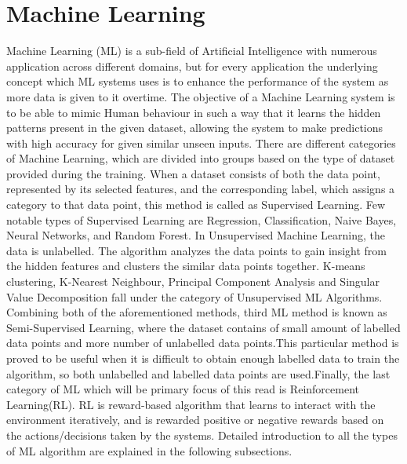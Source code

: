\documentclass[en,]{template/rrlab}
\begin{document}
\section{Machine Learning}
Machine Learning (ML) is a sub-field of Artificial Intelligence with numerous application across different domains, but for every application the underlying concept which ML systems uses is to enhance the performance of the system as more data is given to it overtime. The objective of a Machine Learning system is to be able to mimic Human behaviour in such a way that it learns the hidden patterns present in the given dataset, allowing the system to make predictions with high accuracy for given similar unseen inputs. There are different categories of Machine Learning, which are divided into groups based on the type of dataset provided during the training. When a dataset consists of both the data point, represented by its selected features, and the corresponding label, which assigns a category to that data point, this method is called as Supervised Learning. Few notable types of Supervised Learning are Regression, Classification, Naive Bayes, Neural Networks, and Random Forest. In Unsupervised Machine Learning, the data is unlabelled. The algorithm analyzes the data points to gain insight from the hidden features and clusters the similar data points together. K-means clustering, K-Nearest Neighbour, Principal Component Analysis and Singular Value Decomposition fall under the category of Unsupervised ML Algorithms. Combining both of the aforementioned methods, third ML method is known as Semi-Supervised Learning, where the dataset contains of small amount of labelled data points and more number of unlabelled data points.This particular method is proved to be useful when it is difficult to obtain enough labelled data to train the algorithm, so both unlabelled and labelled data points are used.Finally, the last category of ML which will be primary focus of this read is Reinforcement Learning(RL). RL is reward-based algorithm that learns to interact with the environment iteratively, and is rewarded positive or negative rewards based on the actions/decisions taken by the systems. Detailed introduction to all the types of ML algorithm are explained in the following subsections. 
\end{document}
